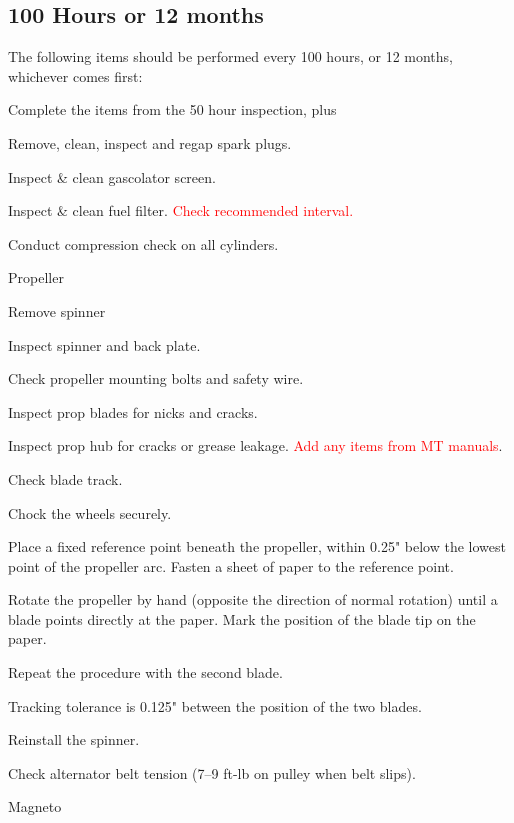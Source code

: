 \subsection{100 Hours or 12 months} The following items should be performed every 100 hours, or 12 months, whichever comes first: 
\begin{enumerate*}
	\item Complete the items from the 50 hour inspection, plus 
	\item Remove, clean, inspect and regap spark plugs.
	\item Inspect \& clean gascolator screen. 
	\item Inspect \& clean fuel filter. \textcolor{red}{Check recommended interval.} 
	\item Conduct compression check on all cylinders. 
	\item Propeller 
	\begin{enumerate*}
		\item Remove spinner 
		\item Inspect spinner and back plate. 
		\item Check propeller mounting bolts and safety wire. 
		\item Inspect prop blades for nicks and cracks. 
		\item Inspect prop hub for cracks or grease leakage. \textcolor{red}{Add any items from MT manuals}. 
		\item Check blade track. 
		\begin{enumerate*}
			\item Chock the wheels securely. 
			\item Place a fixed reference point beneath the propeller, within 0.25" below the lowest point of the propeller arc. Fasten a sheet of paper to the reference point. 
			\item Rotate the propeller by hand (opposite the direction of normal rotation) until a blade points directly at the paper. Mark the position of the blade tip on the paper. 
			\item Repeat the procedure with the second blade. 
			\item Tracking tolerance is 0.125" between the position of the two blades. 
		\end{enumerate*}
		\item Reinstall the spinner. 
	\end{enumerate*}
	\item Check alternator belt tension (7--9 ft-lb on pulley when belt slips). 
	\item Magneto

\end{enumerate*}

